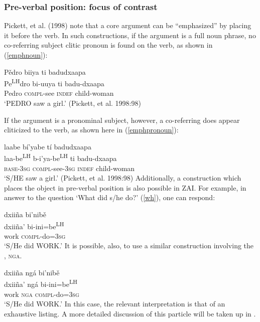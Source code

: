 \z

\subsubsection{Pre-verbal position: focus of contrast}
Pickett, et al. (1998) note that a core argument can be ``emphasized'' by placing it before the verb. In such constructions, if the argument is a full noun phrase, no co-referring subject clitic pronoun is found on the verb, as shown in (\ref{emphnoun}):

\ea\label{emphnoun}
\glll P\v{e}dro biiya ti badudxaapa \\		
Pe\textsuperscript{LH}dro bi-uuya ti badu-dxaapa \\
Pedro \textsc{compl}-see \textsc{indef} child-woman \\
\glt `PEDRO saw a girl.' \hfill (Pickett, et al. 1998:98)

\z
If the argument is a pronominal subject, however, a co-referring  does appear cliticized to the verb, as shown here in (\ref{emphpronoun}):

\ea\label{emphpronoun}
\glll laabe b\'{i}'yabe t\'{i} badudxaapa \\		
laa-be\textsuperscript{LH} b-i'ya-be\textsuperscript{LH} ti badu-dxaapa \\
\textsc{base}-3\textsc{sg} \textsc{compl}-see-3\textsc{sg} \textsc{indef} child-woman \\
\glt `S/HE saw a girl.' \hfill (Pickett, et al. 1998:98)
\z
Additionally, a construction which places the object in pre-verbal position is also possible in ZAI. For example, in answer to the question `What did s/he do?' (\ref{wh}), one can respond:

\ea\label{preverbalobj}
\glll dxiiña bi'nib\v{e} \\
dxiiña' bi-ini=be\textsuperscript{LH} \\
work \textsc{compl}-do=\textsc{3sg} \\
\glt `S/He did WORK.'
\z 
It is possible, also, to use a similar construction involving the , \textsc{nga}.  

\ea\label{preverbalnga}
\glll dxiiña ng\'{a} bi'nib\v{e} \\
dxiiña' ng\'{a} bi-ini=be\textsuperscript{LH} \\
work \textsc{nga} \textsc{compl}-do=\textsc{3sg} \\
\glt `S/He did WORK.'
\z 
In this case, the relevant interpretation is that of an exhaustive listing. A more detailed discussion of this particle will be taken up in .


